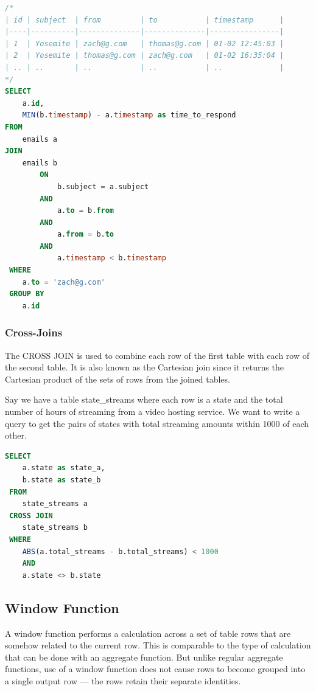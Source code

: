 \documentclass{article}
\begin{document}
\vspace{8pt} \begin{lstlisting}[language=SQL]
/*
| id | subject  | from         | to           | timestamp      |
|----|----------|--------------|--------------|----------------|
| 1  | Yosemite | zach@g.com   | thomas@g.com | 01-02 12:45:03 |
| 2  | Yosemite | thomas@g.com | zach@g.com   | 01-02 16:35:04 |
| .. | ..       | ..           | ..           | ..             |
*/
SELECT 
    a.id, 
    MIN(b.timestamp) - a.timestamp as time_to_respond 
FROM 
    emails a 
JOIN
    emails b 
        ON 
            b.subject = a.subject 
        AND 
            a.to = b.from
        AND 
            a.from = b.to 
        AND 
            a.timestamp < b.timestamp 
 WHERE 
    a.to = 'zach@g.com' 
 GROUP BY 
    a.id 
\end{lstlisting}

\subsubsection{Cross-Joins}
The CROSS JOIN is used to combine each row of the first table with each row of the second table. It is also known as the Cartesian join since it returns the Cartesian product of the sets of rows from the joined tables.

Say we have a table state\_streams where each row is a state and the total number of hours of streaming from a video hosting service. We want to write a query to get the pairs of states with total streaming amounts within 1000 of each other. 

\vspace{8pt} \begin{lstlisting}[language=SQL]
SELECT
    a.state as state_a, 
    b.state as state_b 
 FROM   
    state_streams a
 CROSS JOIN 
    state_streams b 
 WHERE 
    ABS(a.total_streams - b.total_streams) < 1000
    AND 
    a.state <> b.state 
\end{lstlisting}


\subsection{Window Function}
A window function performs a calculation across a set of table rows that are somehow related to the current row. This is comparable to the type of calculation that can be done with an aggregate function. But unlike regular aggregate functions, use of a window function does not cause rows to become grouped into a single output row — the rows retain their separate identities.
\end{document}

